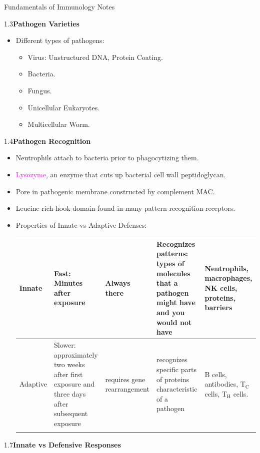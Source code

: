 \documentclass[UTF8]{book}
\date{}
\newcommand{\et}{&}
\newcommand{\concept}[1]{\textcolor{magenta}{#1}}
\begin{document}
\begin{center}
\Large{Fundamentals of Immunology Notes}
\end{center}
1.3\quad \textbf{Pathogen Varieties}
\begin{itemize}
\item Different types of pathogens:
\begin{itemize}
	\item Virus: Unstructured DNA, Protein Coating.
	\item Bacteria.
	\item Fungus.
	\item Unicellular Eukaryotes.
	\item Multicellular Worm.
\end{itemize}
\end{itemize}
1.4\quad \textbf{Pathogen Recognition}
\begin{itemize}
\item  Neutrophils attach to bacteria prior to phagocytizing them.
\item \concept{Lysozyme}, an enzyme that cuts up bacterial cell wall peptidoglycan.
\item Pore in pathogenic membrane constructed by complement MAC.
\item Leucine-rich hook domain found in many pattern recognition receptors.
\item Properties of Innate vs Adaptive Defenses:
\begin{center}
\begin{tabular}{|m{1.5cm}<{\centering}|m{3cm}<{\centering}|m{2cm}<{\centering}|m{3cm}<{\centering}|m{2cm}<{\centering}|} \Xhline{1.2pt}
Innate \et Fast: Minutes after exposure \et Always there \et Recognizes patterns: types of molecules that a pathogen might have and you would not have \et Neutrophils, macrophages, NK cells, proteins, barriers \\ \hline
Adaptive \et Slower: approximately two weeks after first exposure and three days after subsequent exposure \et requires gene rearrangement \et recognizes specific parts of proteins characteristic of a pathogen \et B cells, antibodies, T$_\mathrm{C}$ cells, T$_\mathrm{H}$ cells.\\ \Xhline{1.2pt}
\end{tabular}
\end{center}
\end{itemize}
1.7\quad \textbf{Innate vs Defensive Responses}
\end{document}
